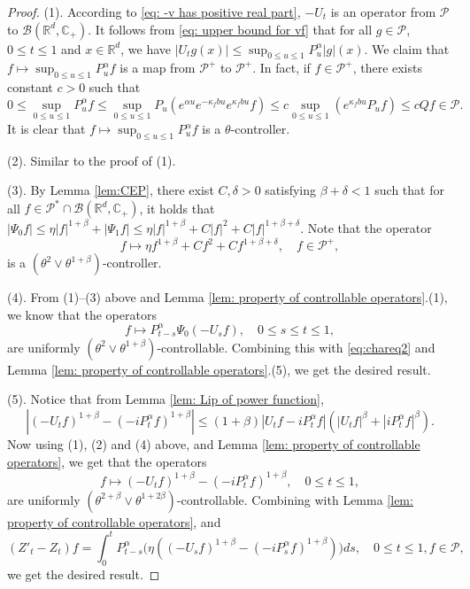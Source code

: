 \documentclass[EJP]{ejpecp} %
\begin{document}
\begin{proof}
	(1). According to \eqref{eq: -v has positive real part}, $-U_t$ is an operator from $\mathcal P$ to $\mathcal B(\mathbb R^d, \mathbb C_+)$.
  	It follows from \eqref{eq: upper bound for vf} that for all $g\in \mathcal P$, $0\leq t\leq 1$ and $x\in \mathbb R^d$, we have $ |U_t g(x)| \leq \sup_{0\leq u\leq 1}P_u^\alpha |g| (x). $
  	We claim that $f\mapsto\sup_{0\leq u\leq 1}P^{\alpha}_u f$ is a map from $\mathcal P^+$ to $\mathcal P^+$. In fact, if $f\in \mathcal P^+$, there exists constant $c>0$ such that
\[
    0
    \leq \sup_{0\leq u\leq 1}P^{\alpha}_u f
    \leq \sup_{0\leq u\leq 1} P_u (e^{\alpha u} e^{-\kappa_f b u} e^{\kappa_f b u} f )
    \leq c \sup_{0\leq u\leq 1} (e^{\kappa_f b u}P_u f) \leq c Qf \in \mathcal P.
\]
	It is clear that $f\mapsto\sup_{0\leq u\leq 1}P^{\alpha}_u f$ is a $\theta$-controller.

 	(2). Similar to the proof of (1).

  	(3). By Lemma \ref{lem:CEP}, there exist $C, \delta >0$ satisfying $\beta+\delta< 1$ such that for all $ f \in \mathcal P^* \cap \mathcal B( \mathbb R^d, \mathbb C_+ )$, it holds that $ |\Psi_0 f| \leq \eta |f|^{1+\beta} + |\Psi_1 f| \leq \eta |f|^{1+\beta} + C|f|^2+ C |f|^{1+\beta + \delta}.$
  	Note that the operator
\[
    f \mapsto \eta f^{1+\beta} + Cf^2+ Cf^{1+\beta + \delta},
    \quad f\in \mathcal P^+,
\]
  	is a $(\theta^2 \vee \theta^{1+\beta})$-controller.

  	(4). From (1)--(3) above and Lemma \ref{lem: property of controllable operators}.(1), we know that the operators
\[
    f \mapsto P^\alpha_{t-s}\Psi_0(-U_sf),
    \quad 0\leq s\leq t\leq 1,
\]
  	are uniformly $(\theta^2\vee \theta^{1+\beta})$-controllable.
  	Combining this with \eqref{eq:chareq2} and
  	Lemma \ref{lem: property of controllable operators}.(5), we get the desired result.

  	(5). Notice that from Lemma \ref{lem: Lip of power function},
\[
    |(-U_t f)^{1+\beta} - (-iP^\alpha_t f)^{1+\beta} |
    \leq  (1+\beta) |U_t f-iP^\alpha_t f|(|U_t f|^{\beta}+|i P^\alpha_t f|^{\beta}).
\]
  	Now using (1), (2) and (4) above, and Lemma \ref{lem: property of controllable operators}, we get that the operators
\[
    f
    \mapsto (-U_t f)^{1+\beta} - (-iP^\alpha_t f)^{1+\beta},
    \quad 0\leq t\leq 1,
\]
  are uniformly $(\theta^{2+\beta}\vee \theta^{1+2\beta})$-controllable.
  Combining with Lemma \ref{lem: property of controllable operators}, and
\[
    (Z'_t - Z_t)f
       = \int_0^t P^\alpha_{t-s}\Big( \eta ((-U_s f)^{1+\beta} - (-iP_s^\alpha f)^{1+\beta} )\Big)ds,
    \quad 0\leq t\leq 1, f\in \mathcal P,
\]
  	we get the desired result.
	

\end{proof}
\end{document}

